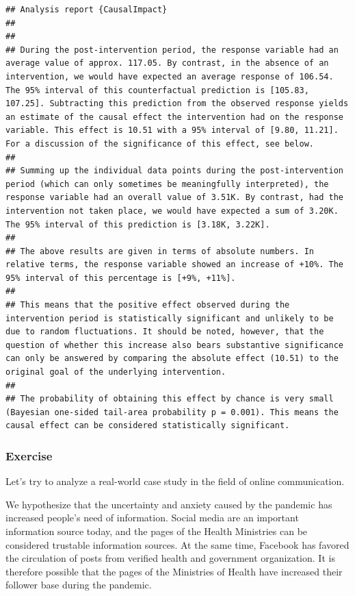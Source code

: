 \documentclass[
]{article}
\begin{document}
\begin{verbatim}
## Analysis report {CausalImpact}
## 
## 
## During the post-intervention period, the response variable had an average value of approx. 117.05. By contrast, in the absence of an intervention, we would have expected an average response of 106.54. The 95% interval of this counterfactual prediction is [105.83, 107.25]. Subtracting this prediction from the observed response yields an estimate of the causal effect the intervention had on the response variable. This effect is 10.51 with a 95% interval of [9.80, 11.21]. For a discussion of the significance of this effect, see below.
## 
## Summing up the individual data points during the post-intervention period (which can only sometimes be meaningfully interpreted), the response variable had an overall value of 3.51K. By contrast, had the intervention not taken place, we would have expected a sum of 3.20K. The 95% interval of this prediction is [3.18K, 3.22K].
## 
## The above results are given in terms of absolute numbers. In relative terms, the response variable showed an increase of +10%. The 95% interval of this percentage is [+9%, +11%].
## 
## This means that the positive effect observed during the intervention period is statistically significant and unlikely to be due to random fluctuations. It should be noted, however, that the question of whether this increase also bears substantive significance can only be answered by comparing the absolute effect (10.51) to the original goal of the underlying intervention.
## 
## The probability of obtaining this effect by chance is very small (Bayesian one-sided tail-area probability p = 0.001). This means the causal effect can be considered statistically significant.
\end{verbatim}

\hypertarget{exercise-2}{%
\subsubsection{Exercise}\label{exercise-2}}

Let's try to analyze a real-world case study in the field of online communication.

We hypothesize that the uncertainty and anxiety caused by the pandemic has increased people's need of information. Social media are an important information source today, and the pages of the Health Ministries can be considered trustable information sources. At the same time, Facebook has favored the circulation of posts from verified health and government organization. It is therefore possible that the pages of the Ministries of Health have increased their follower base during the pandemic.
\end{document}
